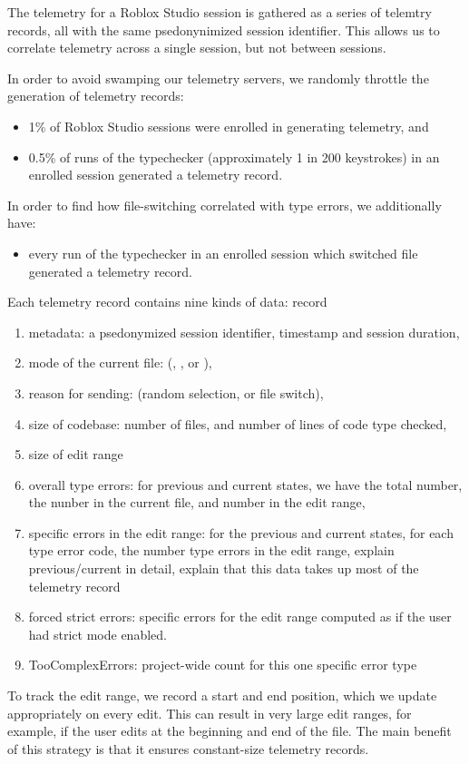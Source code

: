 \documentclass[english,submission,cleveref]{programming}
\begin{document}
The telemetry for a Roblox Studio session is gathered as a series of
telemtry records, all with the same psedonynimized session
identifier. This allows us to correlate telemetry across a single
session, but not between sessions.

In order to avoid swamping our telemetry servers, we randomly throttle
the generation of telemetry records:
\begin{itemize}
  \item
    1\% of Roblox Studio sessions were enrolled in generating telemetry, and
  \item
    0.5\% of runs of the typechecker (approximately 1 in 200 keystrokes)
      in an enrolled session generated a telemetry record.
\end{itemize}
In order to find how file-switching correlated with type errors, we additionally have:
\begin{itemize}
  \item
    every run of the typechecker in an enrolled session which switched file generated a telemetry record.
\end{itemize}
Each telemetry record contains nine kinds of data:
record 
\begin{enumerate}
  \item metadata: a psedonymized session identifier, timestamp and session duration,
  \item mode of the current file: (\mnocheck{}, \mnonstrict{}, or \mstrict{}),
  \item reason for sending: (random selection, or file switch),
  \item size of codebase: number of files, and number of lines of code type checked,
  \item size of edit range
  \item overall type errors: for previous and current states, we have the total number, the nunber in the current file, and number in the edit range,
  \item specific errors in the edit range: for the previous and current states, for each type error code, the number type errors in the edit range,
    \FILL{} explain previous/current in detail, explain that this data takes up most of the telemetry record
  \item forced strict errors: specific errors for the
    edit range computed as if the user had strict mode enabled.
  \item TooComplexErrors: project-wide count for this one specific error type
\end{enumerate}
To track the edit range, we record a start and end position, which we
update appropriately on every edit. This can result in very large edit
ranges, for example, if the user edits at the beginning and end of the
file.
The main benefit of this strategy is that it ensures constant-size telemetry records.
\end{document}
